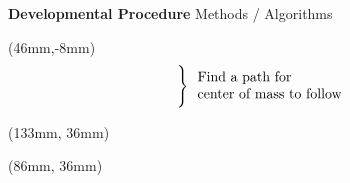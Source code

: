 \documentclass[11pt,aspectratio=169]{beamer}
\begin{document}
\begin{frame}[fragile]{\textbf{Developmental Procedure} \hfill \fontsize{8}{8}\selectfont Methods / Algorithms}
\begin{textblock*}{87mm}
        \end{textblock*}

        \begin{textblock*}{25mm}(46mm,-8mm)
        \begin{equation*}
            \begin{rcases}
              \text{\color{white}-}\\
              \text{\color{white}-}\\
            \end{rcases}   
            \begin{array}{l}
              \text{Find a path for}\\
              \text{center of mass to follow}\\
            \end{array}
        \end{equation*}
        \end{textblock*}

        \begin{textblock*}{5cm}(133mm, 36mm) %
        {\tiny \cite{bb}}
        \end{textblock*}

        \begin{textblock*}{5cm}(86mm, 36mm) %
        {\tiny \cite{bb}}
        \end{textblock*}

\end{frame}
\end{document}
